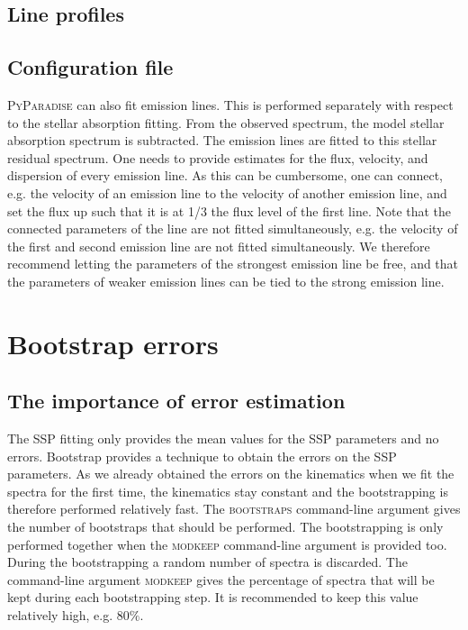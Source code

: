 \documentclass[usenatbib,usegraphicx,useAMS,onecolumn]{mn2e}
\begin{document}
\subsection{Line profiles}
\label{subsec:em_profile}
\subsection{Configuration file}
\label{subsec:em_config}

\textsc{PyParadise} can also fit emission lines.
This is performed separately with respect to the stellar absorption fitting.
From the observed spectrum, the model stellar absorption spectrum is subtracted.
The emission lines are fitted to this stellar residual spectrum.
One needs to provide estimates for the flux, velocity, and dispersion of every emission line.
As this can be cumbersome, one can connect, e.g. the velocity of an emission line to the velocity of another emission line, and set the flux up such that it is at 1/3 the flux level of the first line.
Note that the connected parameters of the line are not fitted simultaneously, e.g. the velocity of the first and second emission line are not fitted simultaneously.
We therefore recommend letting the parameters of the strongest emission line be free, and that the parameters of weaker emission lines can be tied to the strong emission line.

\section{Bootstrap errors}
\label{sec:bootstrap}
\subsection{The importance of error estimation}
\label{subsec:bootstrap_info}
The SSP fitting only provides the mean values for the SSP parameters and no errors.
Bootstrap provides a technique to obtain the errors on the SSP parameters.
As we already obtained the errors on the kinematics when we fit the spectra for the first time, the kinematics stay constant and the bootstrapping is therefore performed relatively fast.
The \textsc{bootstraps} command-line argument gives the number of bootstraps that should be performed.
The bootstrapping is only performed together when the \textsc{modkeep} command-line argument is provided too.
During the bootstrapping a random number of spectra is discarded.
The command-line argument \textsc{modkeep} gives the percentage of spectra that will be kept during each bootstrapping step.
It is recommended to keep this value relatively high, e.g. 80$\%$.
\end{document}
